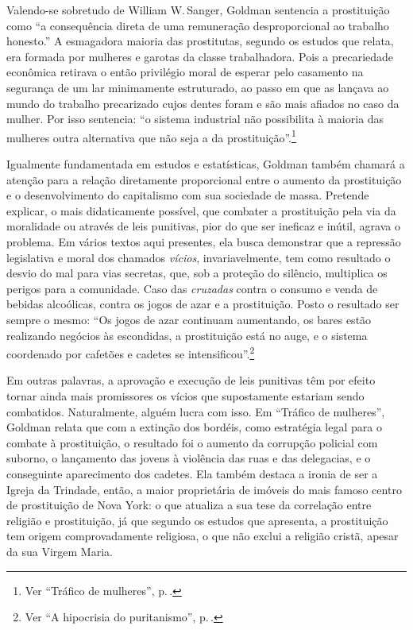 Valendo-se sobretudo de William W.\,Sanger, Goldman sentencia a
prostituição como ``a consequência direta de uma remuneração
desproporcional ao trabalho honesto.'' A esmagadora maioria das
prostitutas, segundo os estudos que relata, era formada por mulheres e
garotas da classe trabalhadora. Pois a precariedade econômica retirava
o então privilégio moral de esperar pelo casamento na segurança
de um lar minimamente estruturado, ao passo em que
as lançava ao mundo do trabalho precarizado cujos dentes
foram e são mais afiados no caso da mulher. Por isso sentencia:
``o sistema industrial não possibilita à maioria das mulheres outra alternativa que não seja a da prostituição''.\footnote{Ver ``Tráfico de mulheres'', p.\,\pageref{trafico}.}

Igualmente fundamentada em estudos e estatísticas, Goldman também
chamará a atenção para a relação diretamente proporcional entre o
aumento da prostituição e o desenvolvimento do capitalismo com sua
sociedade de massa. Pretende explicar, o mais didaticamente
possível, que combater a prostituição pela via da moralidade ou através
de leis punitivas, pior do que ser ineficaz e inútil, agrava o problema.
Em vários textos aqui presentes, ela busca demonstrar que a repressão
legislativa e moral dos chamados \textit{vícios}, invariavelmente, tem como
resultado o desvio do mal para vias secretas, que, sob a proteção do silêncio,
multiplica os perigos para a comunidade.
Caso das
\textit{cruzadas} contra o consumo e venda de bebidas alcoólicas, contra os
jogos de azar e a prostituição. Posto o resultado ser sempre o mesmo:
``Os jogos de azar continuam aumentando, os bares estão realizando
negócios às escondidas, a prostituição está no auge, e o sistema
coordenado por cafetões e cadetes se intensificou''.\footnote{Ver ``A hipocrisia do puritanismo'', p.\,\pageref{hipocrisia}.}

Em outras palavras,
a aprovação e execução de leis punitivas têm por efeito tornar ainda
mais promissores os vícios que supostamente estariam sendo combatidos.
Naturalmente, alguém lucra com isso. Em ``Tráfico de mulheres'', Goldman
relata que com a extinção dos bordéis, como estratégia legal para o
combate à prostituição, o resultado foi o aumento da corrupção policial
com suborno, o lançamento das jovens à violência das ruas e das
delegacias, e o conseguinte aparecimento dos cadetes. Ela também
destaca a ironia de ser a Igreja da Trindade, então, a maior
proprietária de imóveis do mais famoso centro de prostituição de Nova
York: o que atualiza a sua tese da correlação entre religião e
prostituição, já que segundo os estudos que apresenta, a prostituição
tem origem comprovadamente religiosa, o que não exclui a religião
cristã, apesar da sua Virgem Maria. 

